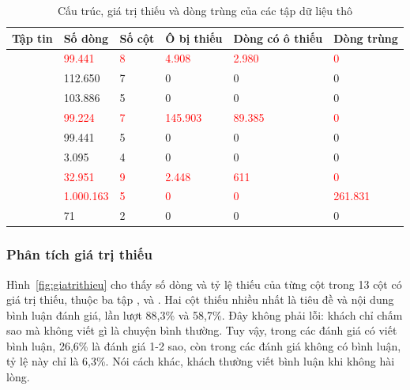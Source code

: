 \begin{table}[H]
\centering
\small{}
\caption{Cấu trúc, giá trị thiếu và dòng trùng của các tập dữ liệu thô}
\label{tab:cautruc}
\begin{tabularx}{\linewidth}{|>{\raggedright\arraybackslash}X|P{1.8cm}|P{1.2cm}|P{1.6cm}|P{1.8cm}|P{1.5cm}|}
\hline
\textbf{Tập tin} & \textbf{Số dòng} & \textbf{Số cột} & \textbf{Ô bị thiếu} & \textbf{Dòng có ô thiếu} & \textbf{Dòng trùng}\\ \hline
\textcolor{red}{} & \textcolor{red}{99.441} & \textcolor{red}{8} & \textcolor{red}{4.908} & \textcolor{red}{2.980} & \textcolor{red}{0}\\ \hline
{} & 112.650 & 7 & 0 & 0 & 0\\ \hline
{} & 103.886 & 5 & 0 & 0 & 0\\ \hline
\textcolor{red}{} & \textcolor{red}{99.224} & \textcolor{red}{7} & \textcolor{red}{145.903} & \textcolor{red}{89.385} & \textcolor{red}{0}\\ \hline
{} & 99.441 & 5 & 0 & 0 & 0\\ \hline
{} & 3.095 & 4 & 0 & 0 & 0\\ \hline
\textcolor{red}{} & \textcolor{red}{32.951} & \textcolor{red}{9} & \textcolor{red}{2.448} & \textcolor{red}{611} & \textcolor{red}{0}\\ \hline
\textcolor{red}{} & \textcolor{red}{1.000.163} & \textcolor{red}{5} & \textcolor{red}{0} & \textcolor{red}{0} & \textcolor{red}{261.831}\\ \hline
{} & 71 & 2 & 0 & 0 & 0\\ \hline
\end{tabularx}
\end{table}

\subsubsection{Phân tích giá trị thiếu}

Hình~\ref{fig:giatrithieu} cho thấy số dòng và tỷ lệ thiếu của từng cột trong 13 cột có giá trị thiếu, thuộc ba tập ,  và . Hai cột thiếu nhiều nhất là tiêu đề và nội dung bình luận đánh giá, lần lượt 88,3\% và 58,7\%. Đây không phải lỗi: khách chỉ chấm sao mà không viết gì là chuyện bình thường. Tuy vậy, trong các đánh giá có viết bình luận, 26,6\% là đánh giá 1-2 sao, còn trong các đánh giá không có bình luận, tỷ lệ này chỉ là 6,3\%. Nói cách khác, khách thường viết bình luận khi không hài lòng.

